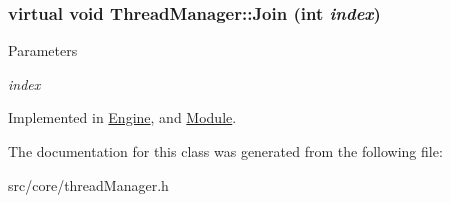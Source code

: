 \hypertarget{classThreadManager_a3c1b72b44ca4ffa3652088d44937b9d0}{
\subsubsection[{Join}]{\setlength{\rightskip}{0pt plus 5cm}virtual void ThreadManager::Join (int {\em index})}}
\label{de/d57/classThreadManager_a3c1b72b44ca4ffa3652088d44937b9d0}

\begin{DoxyParams}{Parameters}
\item[{\em index}]\end{DoxyParams}


Implemented in \hyperlink{classEngine_afe5c1c859cfe9b121627156dfbd58e6b}{Engine}, and \hyperlink{classModule_ac141815618543512136b7f4e0c90d311}{Module}.



The documentation for this class was generated from the following file:\begin{DoxyCompactItemize}
\item 
src/core/threadManager.h\end{DoxyCompactItemize}

